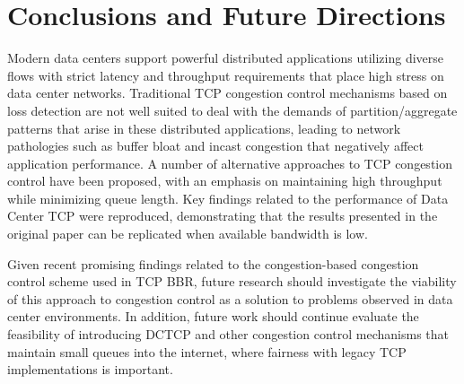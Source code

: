 \section{Conclusions and Future Directions}

Modern data centers support powerful distributed applications utilizing diverse flows with strict latency and throughput requirements that place high stress on data center networks. Traditional TCP congestion control mechanisms based on loss detection are not well suited to deal with the demands of partition/aggregate patterns that arise in these distributed applications, leading to network pathologies such as buffer bloat and incast congestion that negatively affect application performance. A number of alternative approaches to TCP congestion control have been proposed, with an emphasis on maintaining high throughput while minimizing queue length. Key findings related to the performance of Data Center TCP were reproduced, demonstrating that the results presented in the original paper can be replicated when available bandwidth is low. 

Given recent promising findings related to the congestion-based congestion control scheme used in TCP BBR, future research should investigate the viability of this approach to congestion control as a solution to problems observed in data center environments. In addition, future work should continue evaluate the feasibility of introducing DCTCP and other congestion control mechanisms that maintain small queues into the internet, where fairness with legacy TCP implementations is important. 
